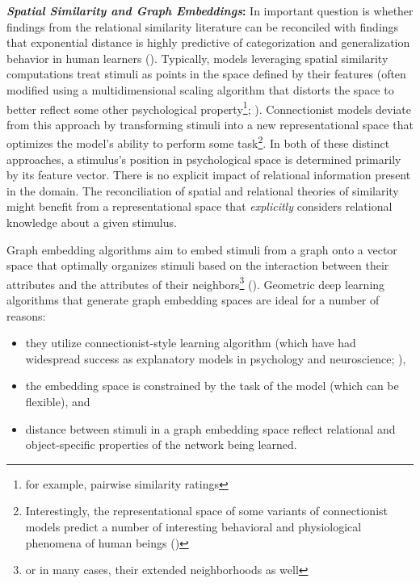 \documentclass[12pt]{article}
\let\oldcite=\cite
\renewcommand{\cite}[1]{\textcolor[rgb]{0, .121, .388}{\oldcite{#1}}}
\begin{document}
\textbf{\emph{Spatial Similarity and Graph Embeddings}:} In important question is whether findings from the relational similarity literature can be reconciled with findings that exponential distance is highly predictive of categorization and generalization behavior in human learners (\cite{shepard1987toward,nosofsky1994comparing,kruschke1992alcove,love2004sustain}). Typically, models leveraging spatial similarity computations treat stimuli as points in the space defined by their features (often modified using a multidimensional scaling algorithm that distorts the space to better reflect some other psychological property\footnote{for example, pairwise similarity ratings}; \cite{shepard1962analysis}). Connectionist models deviate from this approach by transforming stimuli into a new representational space that optimizes the model's ability to perform some task\footnote{Interestingly, the representational space of some variants of connectionist models predict a number of interesting behavioral and physiological phenomena of human beings (\cite{lake2015deep,peterson2016adapting,long2018mid,khaligh2014deep})}. In both of these distinct approaches, a stimulus's position in psychological space is determined primarily by its feature vector. There is no explicit impact of relational information present in the domain. The reconciliation of spatial and relational theories of similarity might benefit from a representational space that \emph{explicitly} considers relational knowledge about a given stimulus.

Graph embedding algorithms aim to embed stimuli from a graph onto a vector space that optimally organizes stimuli based on the interaction between their attributes and the attributes of their neighbors\footnote{or in many cases, their extended neighborhoods as well} (\cite{wu2020comprehensive,kipf2016semi,velivckovic2017graph}). Geometric deep learning algorithms that generate graph embedding spaces are ideal for a number of reasons:

\begin{itemize}
    \item they utilize connectionist-style learning algorithm (which have had widespread success as explanatory models in psychology and neuroscience; \cite{lake2015deep,peterson2016adapting,long2018mid,khaligh2014deep}),
    \item the embedding space is constrained by the task of the model (which can be flexible), and
    \item distance between stimuli in a graph embedding space reflect relational and object-specific properties of the network being learned.
\end{itemize} 
\end{document}
